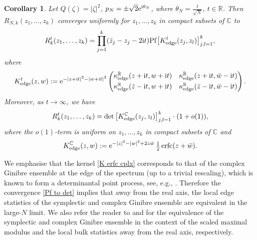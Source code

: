 \documentclass[pdftex]{sigma}
\numberwithin{equation}{section}
\newtheorem{Corollary}[Theorem]{Corollary}
\newcommand{\erfc}{\operatorname{erfc}}
\newcommand{\R}{{\mathbb R}}
\newcommand{\C}{{\mathbb C}}
\newcommand{\1}{\chi}
\newcommand{\Pf}{{\operatorname{Pf}}}
\begin{document}
\begin{Corollary} \label{Cor_Pf to det}
	Let $Q(\zeta)=|\zeta|^2$, $p_N=\pm \sqrt{2} {\rm e}^{{\rm i}\theta_N}$, where $\theta_N=\frac{t}{\sqrt{N}}$, $t \in \R$. Then $R_{N,k}(z_1,\dots, z_k)$ converges uniformly for $z_1,\dots, z_k$ in compact subsets of $\C$ to
	\begin{gather}\label{R_k^t Pf}
		R_k^t(z_1,\dots, z_k)= \prod_{j=1}^{k} ( \bar{z}_j-z_j-2{\rm i}t ) \Pf \big[ K_{{\rm edge}}^t(z_j,z_l) \big]_{ j,l=1 }^k,
	\end{gather}
	where
	\begin{gather*}
		K_{{\rm edge}}^t(z,w):={\rm e}^{-|z+{\rm i}t|^2-|w+{\rm i}t|^2}
		\begin{pmatrix}
			\kappa_{{\rm edge}}^\R (z+{\rm i}t,w+{\rm i}t) & \kappa_{{\rm edge}}^\R (z+{\rm i}t,\bar{w}-{\rm i}t)
			\vspace{1mm}\\
			\kappa_{{\rm edge}}^\R (\bar{z}-{\rm i}t,w+{\rm i}t) & \kappa_{{\rm edge}}^\R (\bar{z}-{\rm i}t,\bar{w}-{\rm i}t)
		\end{pmatrix}.
	\end{gather*}
	Moreover, as $t \to \infty$, we have
	\begin{gather} \label{Pf to det}
		R_k^t(z_1,\dots, z_k)= \det \big[ K_{{\rm edge}}^\C (z_j,z_l) \big]_{j,l=1}^k \cdot (1+o(1)),
	\end{gather}
	where the $o(1)$-term is uniform on $z_1,\dots, z_k$ in compact subsets of $\C$ and
	\begin{gather} \label{K erfc cplx}
		K_{{\rm edge}}^\C(z,w):={\rm e}^{ -|z|^2-|w|^2+2z\bar{w} } \, \tfrac{1}{2}\erfc(z+\bar{w}).
	\end{gather}
\end{Corollary}

We emphasise that the kernel \eqref{K erfc cplx} corresponds to that of the complex Ginibre ensemble at the edge of the spectrum (up to a trivial rescaling), which is known to form a determinantal point process, see, e.g., \cite{MR2530159,MR1690355,kanzieper2005exact}. Therefore the convergence \eqref{Pf to det} implies that away from the real axis, the local edge statistics of the symplectic and complex Ginibre ensemble are equivalent in the large-$N$ limit.
We also refer the reader to \cite{Dubach2020,MR1986426} and \cite{akemann2019universal} for the equivalence of the symplectic and complex Ginibre ensemble in the context of the scaled maximal modulus and the local bulk statistics away from the real axis, respectively.
\end{document}
